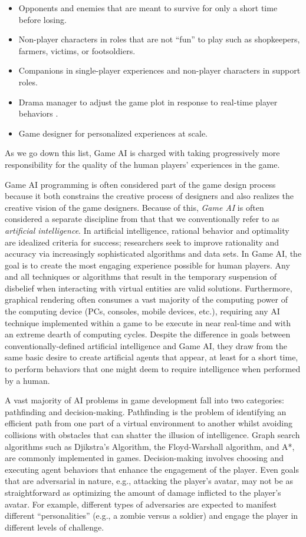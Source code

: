 \documentclass[letterpaper]{article}
\begin{document}
\begin{itemize}
\item Opponents and enemies that are meant to survive for only a short time before losing.
\item Non-player characters in roles that are not ``fun'' to play such as shopkeepers, farmers, victims, or footsoldiers.
\item Companions in single-player experiences and non-player characters in support roles.
\item Drama manager to adjust the game plot in response to real-time player behaviors \cite{riedl:aimag2013}.
\item Game designer for personalized experiences at scale.
\end{itemize}

\noindent
As we go down this list, Game AI is charged with taking progressively more responsibility for the quality of the human players' experiences in the game.

Game AI programming is often considered part of the game design process because it both constrains the creative process of designers and also realizes the creative vision of the game designers.
Because of this, {\em Game AI} is often considered a separate discipline from that that we conventionally refer to as {\em artificial intelligence}.
In artificial intelligence, rational behavior and optimality are idealized criteria for success; researchers seek to improve rationality and accuracy via increasingly sophisticated algorithms and data sets.  
In Game AI, the goal is to create the most engaging experience possible for human players.
Any and all techniques or algorithms that result in the temporary suspension of disbelief when interacting with virtual entities are valid solutions.
Furthermore, graphical rendering often consumes a vast majority of the computing power of the computing device (PCs, consoles, mobile devices, etc.), requiring any AI technique implemented within a game to be execute in near real-time and with an extreme dearth of computing cycles.
Despite the difference in goals between conventionally-defined artificial intelligence and Game AI, they draw from the same basic desire to create artificial agents that appear, at least for a short time, to perform behaviors that one might deem to require intelligence when performed by a human.

A vast majority of AI problems in game development fall into two categories: pathfinding and decision-making. 
Pathfinding is the problem of identifying an efficient path from one part of a virtual environment to another whilst avoiding collisions with obstacles that can shatter the illusion of intelligence.
Graph search algorithms such as Djikstra's Algorithm, the Floyd-Warshall algorithm, and A*, are commonly implemented in games.
Decision-making involves choosing and executing agent behaviors that enhance the engagement of the player.
Even goals that are adversarial in nature, e.g., attacking the player's avatar, may not be as straightforward as optimizing the amount of damage inflicted to the player's avatar. 
For example, different types of adversaries are expected to manifest different ``personalities'' (e.g., a zombie versus a soldier) and engage the player in different levels of challenge.
\end{document}

